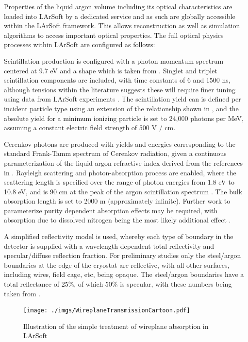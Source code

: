 \documentclass[12pt]{elsarticle}
\begin{document}
Properties of the liquid argon volume including its optical characteristics are loaded into LArSoft by a dedicated service and as such are globally accessible within the LArSoft framework.  This allows reconstruction as well as simulation algorithms to access important optical properties.  The full optical physics processes within LArSoft are configured as follows:

Scintillation production is configured with a photon momentum spectrum centered at 9.7 eV and a shape which is taken from \cite{spectrum}.  Singlet and triplet scintillation components are included, with time constants of 6 and 1500 ns, although tensions within the literature suggests these will require finer tuning using data from LArSoft experiments \cite{fastslow}.  The scintillation yield can is defined per incident particle type using an extension of the relationship shown in \cite{scintyield}, and the absolute yield for a minimum ionizing particle is set to 24,000 photons per MeV, assuming a constant electric field strength of 500 V / cm. 

Cerenkov photons are produced with yields and energies corresponding to the standard Frank-Tamm spectrum of Cerenkov radiation, given a continuous parameterization of the liquid argon refractive index derived from the references in \cite{RIndex}. Rayleigh scattering and photon-absorption process are enabled, where the scattering length is specified over the range of photon energies from 1.8 eV to 10.8 eV, and is 90 cm at the peak of the argon scintillation spectrum \cite{Rlength}.  The bulk absorption length is set to 2000 m (approximately infinite). Further work to parameterize purity dependent absorption effects may be required, with absorption due to dissolved nitrogen being the most likely additional effect \cite{nitrogen}.

A simplified reflectivity model is used, whereby each type of boundary in the detector is supplied with a wavelength dependent total reflectivity and specular/diffuse reflection fraction.   For  preliminary  studies  only the  steel/argon boundaries  at  the  edge of the cryostat are  reflective,  with  all  other  surfaces,  including  wires,  field cage,  etc,  being opaque.   The steel/argon boundaries have a total reflectance of 25\%, of which 50\% is specular, with these numbers being taken from \cite{reflectances}.  

\begin{figure}[t]
\centering
\caption{Illustration of the simple treatment of wireplane absorption in LArSoft}
\texttt{[image: ./imgs/WireplaneTransmissionCartoon.pdf]}
\label{fig:wireplaneabs}
\end{figure}
\end{document}
